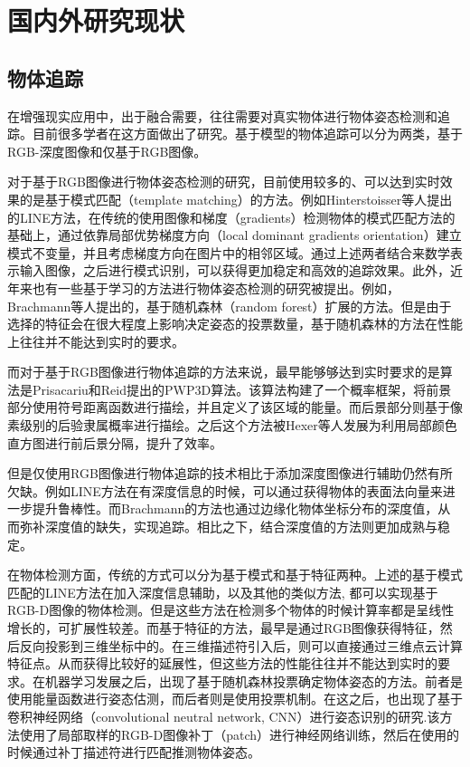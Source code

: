 \section{国内外研究现状}
\subsection{物体追踪}
在增强现实应用中，出于融合需要，往往需要对真实物体进行物体姿态检测和追踪。目前很多学者在这方面做出了研究。基于模型的物体追踪可以分为两类，基于RGB-深度图像和仅基于RGB图像。

对于基于RGB图像进行物体姿态检测的研究，目前使用较多的、可以达到实时效果的是基于模式匹配（template matching）的方法。例如Hinterstoisser等人提出的LINE方法\cite{hinterstoisser2011gradient}，在传统的使用图像和梯度（gradients）检测物体的模式匹配方法的基础上，通过依靠局部优势梯度方向（local dominant gradients orientation）建立模式不变量，并且考虑梯度方向在图片中的相邻区域。通过上述两者结合来数学表示输入图像，之后进行模式识别，可以获得更加稳定和高效的追踪效果。此外，近年来也有一些基于学习的方法进行物体姿态检测的研究被提出。例如，Brachmann等人提出的，基于随机森林（random forest）扩展的方法。\cite{brachmann2016uncertainty}但是由于选择的特征会在很大程度上影响决定姿态的投票数量，基于随机森林的方法在性能上往往并不能达到实时的要求。

而对于基于RGB图像进行物体追踪的方法来说，最早能够够达到实时要求的是算法是Prisacariu和Reid提出的PWP3D算法\cite{prisacariu2012pwp3d}。该算法构建了一个概率框架，将前景部分使用符号距离函数进行描绘，并且定义了该区域的能量。而后景部分则基于像素级别的后验隶属概率进行描绘。之后这个方法被Hexer等人发展为利用局部颜色直方图进行前后景分隔，提升了效率。\cite{hexner20162d}

但是仅使用RGB图像进行物体追踪的技术相比于添加深度图像进行辅助仍然有所欠缺。例如LINE方法\cite{hinterstoisser2011gradient}在有深度信息的时候，可以通过获得物体的表面法向量来进一步提升鲁棒性。而Brachmann的方法\cite{brachmann2016uncertainty}也通过边缘化物体坐标分布的深度值，从而弥补深度值的缺失，实现追踪。相比之下，结合深度值的方法则更加成熟与稳定。

在物体检测方面，传统的方式可以分为基于模式和基于特征两种。上述的基于模式匹配的LINE方法\cite{hinterstoisser2011gradient}在加入深度信息辅助，以及其他的类似方法\cite{kehl2016hashmod, rios2013discriminatively}, 都可以实现基于RGB-D图像的物体检测。但是这些方法在检测多个物体的时候计算率都是呈线性增长的，可扩展性较差。而基于特征的方法，最早是通过RGB图像获得特征\cite{lowe2004distinctive}，然后反向投影到三维坐标中的\cite{lowe2001local}。在三维描述符引入后，则可以直接通过三维点云计算特征点\cite{mian2010repeatability}。从而获得比较好的延展性，但这些方法的性能往往并不能达到实时的要求。在机器学习发展之后，出现了基于随机森林投票确定物体姿态的方法。\cite{brachmann2016uncertainty, tejani2014latent}前者是使用能量函数进行姿态估测，而后者则是使用投票机制。在这之后，也出现了基于卷积神经网络（convolutional neutral network, CNN）进行姿态识别的研究\cite{kehl2016deep}.该方法使用了局部取样的RGB-D图像补丁（patch）进行神经网络训练，然后在使用的时候通过补丁描述符进行匹配推测物体姿态。

